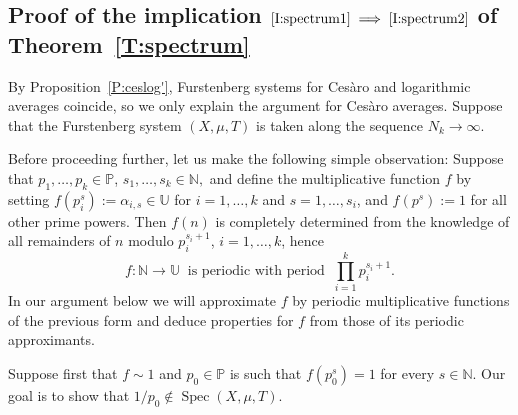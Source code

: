 \documentclass[11pt]{amsart}
\theoremstyle{definition}
\newcommand{\N}{{\mathbb N}}
\renewcommand{\P}{{\mathbb P}}
\DeclareMathOperator{\spec}{Spec}
\begin{document}
\subsection{Proof of the implication $\eqref{I:spectrum1}\implies \eqref{I:spectrum2}$ of Theorem~\ref{T:spectrum}}\label{SS:spectrumproof1}
By Proposition~\ref{P:ceslog'}, Furstenberg systems for Ces\`aro and logarithmic averages coincide, so we only explain the argument for Ces\`aro averages. Suppose that the Furstenberg system $(X,\mu,T)$ is taken along the sequence $N_k\to\infty$.


Before proceeding further, let us make the following simple observation: Suppose  that $p_1,\ldots,p_k\in\mathbb{P}$, $s_1,\ldots,s_k\in\mathbb{N},$ and define the multiplicative function $f$ by setting $f(p^s_i):=\alpha_{i,s}\in\mathbb{U}$ for $i=1,\ldots,k$ and $s=1,\ldots,  s_i$,  and $f(p^s):=1$ for all other prime powers. Then $f(n)$ is completely determined from the knowledge of all remainders of $n$ modulo $p_i^{s_{i}+1}$, $i=1,\ldots,k$, hence
\begin{equation}\label{E:fper}
f\colon \mathbb{N}\to \mathbb{U}\ \text{ is periodic with period }\ \prod_{i=1}^kp_i^{s_i+1}.
\end{equation}
In our argument below we will approximate $f$ by periodic multiplicative functions of the previous form and deduce properties for $f$ from those of its periodic approximants. 
 
 Suppose first that $f\sim 1$  and  $p_0\in \P$ is such that $f(p_0^s)=1$ for every $s\in \N$. Our goal is to show
that  $1/p_0\not\in \spec(X,\mu,T)$.
\end{document}
